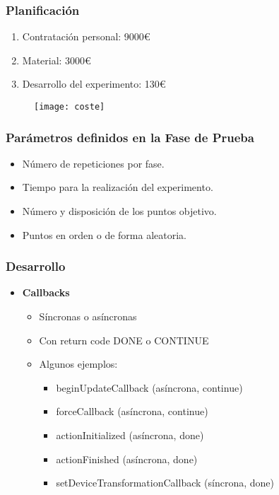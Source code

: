 \begin{frame}
	\frametitle{Planificación}
	
	\begin{enumerate}
		\item Contratación personal: 9000\euro
		\item Material: 3000\euro
		\item Desarrollo del experimento: 130\euro
	\end{enumerate}	
	
	\begin{figure}
		\centering
		\texttt{[image: coste]}
	\end{figure}
	
\end{frame}
\begin{frame}
	\frametitle{Parámetros definidos en la Fase de Prueba}
	
	\begin{itemize}
		\item Número de repeticiones por fase. 
		\item Tiempo para la realización del experimento.
		\item Número y disposición de los puntos objetivo.
		\item Puntos en orden o de forma aleatoria.
	\end{itemize}	
	\begin{figure}
		\centering
	\end{figure}
	
\end{frame}
\begin{frame}
	\frametitle{Desarrollo}
	\begin{itemize}
		\item \textbf{Callbacks}
		\begin{itemize}
			\item Síncronas o asíncronas
			\item Con return code DONE o CONTINUE
			\item Algunos ejemplos:
			\begin{itemize}
				\item beginUpdateCallback (asíncrona, continue)
				\item forceCallback (asíncrona, continue)
				\item actionInitialized (asíncrona, done)
				\item actionFinished (asíncrona, done)
				\item setDeviceTransformationCallback (síncrona, done)
			\end{itemize}
		\end{itemize}
		
	\end{itemize}
	
\end{frame}

